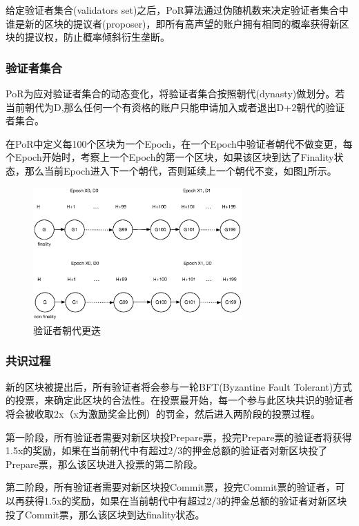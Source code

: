 给定验证者集合(validators set)之后，PoR算法通过伪随机数来决定验证者集合中谁是新的区块的提议者(proposer)，即所有高声望的账户拥有相同的概率获得新区块的提议权，防止概率倾斜衍生垄断。

\subsubsection{验证者集合}
\label{por:design:validators}

PoR为应对验证者集合的动态变化，将验证者集合按照朝代(dynasty)做划分。若当前朝代为D,那么任何一个有资格的账户只能申请加入或者退出D+2朝代的验证者集合。

在PoR中定义每100个区块为一个Epoch，在一个Epoch中验证者朝代不做变更，每个Epoch开始时，考察上一个Epoch的第一个区块，如果该区块到达了Finality状态，那么当前Epoch进入下一个朝代，否则延续上一个朝代不变，如图\ref{fig:epoch}所示。

\begin{figure}[h]
\centering
\includegraphics[width=8cm]{./figs/epoch}
\caption{验证者朝代更迭}
\label{fig:epoch}
\end{figure}

\subsubsection{共识过程}
\label{por:design:consensus}

新的区块被提出后，所有验证者将会参与一轮BFT(Byzantine Fault Tolerant)方式的投票，来确定此区块的合法性。在投票最开始，每一个参与此区块共识的验证者将会被收取2x（x为激励奖金比例）的罚金，然后进入两阶段的投票过程。

第一阶段，所有验证者需要对新区块投Prepare票，投完Prepare票的验证者将获得1.5x的奖励，如果在当前朝代中有超过2/3的押金总额的验证者对新区块投了Prepare票，那么该区块进入投票的第二阶段。

第二阶段，所有验证者需要对新区块投Commit票，投完Commit票的验证者，可以再获得1.5x的奖励，如果在当前朝代中有超过2/3的押金总额的验证者对新区块投了Commit票，那么该区块到达finality状态。

